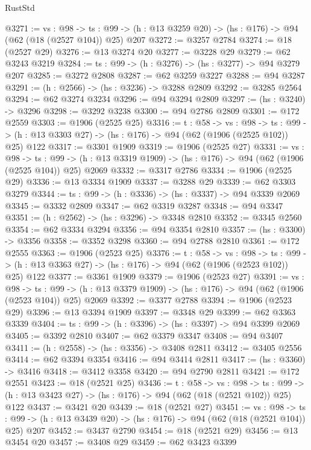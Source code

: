 \begin{lexlean}{RustStd}
\begin{coremodule}
{\begin{coremodule}
{{{{{{{{{{{@3271 := {vs : @98} ->
  {ts : @99} -> (h : @13 @3259 @20) -> (hs : @176) -> @94 (@62 (@18 (@2527 @104)) @25) @207
@3272 := @3257 @2784
@3274 := @18 (@2527 @29)
@3276 := @13 @3274 @20
@3277 := @3228 @29
@3279 := @62 @3243 @3219
@3284 := {ts : @99} -> (h : @3276) -> (hs : @3277) -> @94 @3279 @207
@3285 := @3272 @2808
@3287 := @62 @3259 @3227
@3288 := @94 @3287
@3291 := (h : @2566) -> (hs : @3236) -> @3288 @2809
@3292 := @3285 @2564
@3294 := @62 @3274 @3234
@3296 := @94 @3294 @2809
@3297 := (hs : @3240) -> @3296
@3298 := @3292 @3238
@3300 := @94 @2786 @2809
@3301 := @172 @2559
@3303 := @1906 (@2525 @25)
@3316 := {t : @58} ->
  {vs : @98} ->
  {ts : @99} -> (h : @13 @3303 @27) -> (hs : @176) -> @94 (@62 (@1906 (@2525 @102)) @25) @122
@3317 := @3301 @1909
@3319 := @1906 (@2525 @27)
@3331 := {vs : @98} ->
  {ts : @99} -> (h : @13 @3319 @1909) -> (hs : @176) -> @94 (@62 (@1906 (@2525 @104)) @25) @2069
@3332 := @3317 @2786
@3334 := @1906 (@2525 @29)
@3336 := @13 @3334 @1909
@3337 := @3288 @29
@3339 := @62 @3303 @3279
@3344 := {ts : @99} -> (h : @3336) -> (hs : @3337) -> @94 @3339 @2069
@3345 := @3332 @2809
@3347 := @62 @3319 @3287
@3348 := @94 @3347
@3351 := (h : @2562) -> (hs : @3296) -> @3348 @2810
@3352 := @3345 @2560
@3354 := @62 @3334 @3294
@3356 := @94 @3354 @2810
@3357 := (hs : @3300) -> @3356
@3358 := @3352 @3298
@3360 := @94 @2788 @2810
@3361 := @172 @2555
@3363 := @1906 (@2523 @25)
@3376 := {t : @58} ->
  {vs : @98} ->
  {ts : @99} -> (h : @13 @3363 @27) -> (hs : @176) -> @94 (@62 (@1906 (@2523 @102)) @25) @122
@3377 := @3361 @1909
@3379 := @1906 (@2523 @27)
@3391 := {vs : @98} ->
  {ts : @99} -> (h : @13 @3379 @1909) -> (hs : @176) -> @94 (@62 (@1906 (@2523 @104)) @25) @2069
@3392 := @3377 @2788
@3394 := @1906 (@2523 @29)
@3396 := @13 @3394 @1909
@3397 := @3348 @29
@3399 := @62 @3363 @3339
@3404 := {ts : @99} -> (h : @3396) -> (hs : @3397) -> @94 @3399 @2069
@3405 := @3392 @2810
@3407 := @62 @3379 @3347
@3408 := @94 @3407
@3411 := (h : @2558) -> (hs : @3356) -> @3408 @2811
@3412 := @3405 @2556
@3414 := @62 @3394 @3354
@3416 := @94 @3414 @2811
@3417 := (hs : @3360) -> @3416
@3418 := @3412 @3358
@3420 := @94 @2790 @2811
@3421 := @172 @2551
@3423 := @18 (@2521 @25)
@3436 := {t : @58} ->
  {vs : @98} ->
  {ts : @99} -> (h : @13 @3423 @27) -> (hs : @176) -> @94 (@62 (@18 (@2521 @102)) @25) @122
@3437 := @3421 @20
@3439 := @18 (@2521 @27)
@3451 := {vs : @98} ->
  {ts : @99} -> (h : @13 @3439 @20) -> (hs : @176) -> @94 (@62 (@18 (@2521 @104)) @25) @207
@3452 := @3437 @2790
@3454 := @18 (@2521 @29)
@3456 := @13 @3454 @20
@3457 := @3408 @29
@3459 := @62 @3423 @3399
}}}}}}}}}}}
\end{coremodule}}
\end{coremodule}
\end{lexlean}
